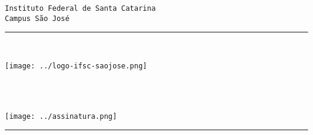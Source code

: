 \documentclass[11pt,a4paper]{memoir}
\begin{document}
    \begin{Spacing}{0.75}%
    \noindent
    \texttt{\fontsize{4mm}{5mm}\selectfont Instituto Federal de Santa Catarina}\\
    \texttt{\fontsize{3mm}{4mm}\selectfont Campus São José}\\ 
    \rule{74mm}{.3mm}\\
    \begin{minipage}[t]{33mm}
        \vspace{-2mm}%
        \hspace*{0mm}\texttt{[image: ../logo-ifsc-saojose.png]}
    \end{minipage}
    \hspace{1mm}
    \begin{minipage}[t]{42mm}
        \vspace{-4mm}%
        \begin{flushleft}
        {\scriptsize
            \begin{Spacing}{1}%
            \vspace{1mm}
            \hspace{-17mm}\texttt{\fontsize{2.6mm}{2mm}}\\
            \hspace{-17mm}\texttt{\fontsize{2.6mm}{2mm}}\\
            \hspace{-17mm}\texttt{\fontsize{2.6mm}{2mm}}
            \end{Spacing}
        }
    \begin{minipage}[t]{33mm}
        \vspace{-1mm}%
        \hspace{-2mm}\texttt{[image: ../assinatura.png]}
    \end{minipage}
        \end{flushleft}
    \end{minipage}
    \vspace{-0.5mm}
    \rule{74mm}{0.3mm}\\
    \end{Spacing}
    \vspace{-5mm} \hspace*{15mm} \texttt{\fontsize{2mm}{3mm} {}}
\end{document}
